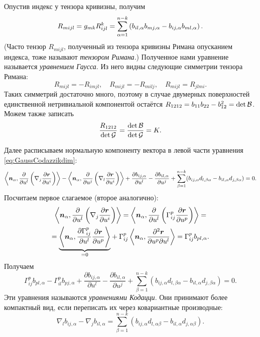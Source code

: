 Опустив индекс у тензора кривизны, получим
\[
	R_{mijl} = g_{mk}R^k_{ijl} = \sum_{\alpha = 1}^{n - k}\left(b_{il, \alpha}b_{mj, \alpha} - b_{ij, \alpha}b_{ml, \alpha}\right).
\]
(Часто тензор $R_{mijl}$, полученный из тензора кривизны Римана опусканием индекса, тоже называют \textit{тензором Римана}.) Полученное нами уравнение называется \textit{уравнением Гаусса}. Из него видны следующие симметрии тензора Римана:
\[
	R_{mijl} = -R_{imjl},\quad R_{mijl} = -R_{milj},\quad R_{mijl} = R_{jlmi}.
\]
Таких симметрий достаточно много, поэтому в случае двумерных поверхностей единственной нетривиальной компонентой остаётся $R_{1212} = b_{11}b_{22} - b_{12}^2 = \det\mathcal{B}$. Можем также записать
\[
	\frac{R_{1212}}{\det\mathcal{G}} = \frac{\det\mathcal{B}}{\det\mathcal{G}} = K.
\]

Далее расписываем нормальную компоненту вектора в левой части уравнения \eqref{eq:GaussCodazzikdim}:
\[
	\left\langle\boldsymbol{n}_\alpha, \frac{\partial}{\partial u^l}\left(\nabla_j\frac{\partial\boldsymbol{r}}{\partial u^i}\right)\right\rangle - \left\langle\boldsymbol{n}_\alpha, \frac{\partial}{\partial u^j}\left(\nabla_l\frac{\partial\boldsymbol{r}}{\partial u^i}\right)\right\rangle + \frac{\partial b_{ij, \alpha}}{\partial u^l} - \frac{\partial b_{il, \alpha}}{\partial u^j} + \sum_{\beta = 1}^{n - k}(b_{ij, \alpha}d_{l, \beta\alpha} - b_{il, \alpha}d_{j, \beta\alpha}) = 0.
\]
Посчитаем первое слагаемое (второе аналогично):
\begin{multline*}
	\left\langle\boldsymbol{n}_\alpha, \frac{\partial}{\partial u^l}\left(\nabla_j\frac{\partial\boldsymbol{r}}{\partial u^i}\right)\right\rangle = \left\langle\boldsymbol{n}_\alpha, \frac{\partial}{\partial u^l}\left(\Gamma_{ij}^p\frac{\partial\boldsymbol{r}}{\partial u^p}\right)\right\rangle =\\ = {\underbrace{\left\langle\boldsymbol{n}_\alpha, \frac{\partial\Gamma_{ij}^p}{\partial u^l}\frac{\partial\boldsymbol{r}}{\partial u^p}\right\rangle}_{= 0}} + \Gamma_{ij}^p\left\langle\boldsymbol{n}_\alpha, \frac{\partial^2\boldsymbol{r}}{\partial u^p\partial u^l}\right\rangle = \Gamma_{ij}^pb_{pl, \alpha}.
\end{multline*}
Получаем
\[
	\Gamma_{ij}^pb_{pl, \alpha} - \Gamma_{il}^pb_{pj, \alpha} + \frac{\partial b_{ij, \alpha}}{\partial u^l} - \frac{\partial b_{il, \alpha}}{\partial u^j} + \sum_{\beta = 1}^{n - k}(b_{ij, \alpha}d_{l, \beta\alpha} - b_{il, \alpha}d_{j, \beta\alpha}) = 0.
\]
Эти уравнения называются \textit{уравнениями Кодацци}. Они принимают более компактный вид, если переписать их через ковариантные производные:
\[
	\nabla_lb_{ij, \alpha} - \nabla_jb_{il, \alpha} = \sum_{\beta = 1}^{n - k}(b_{ij, \alpha}d_{l, \alpha\beta} - b_{il, \alpha}d_{j, \alpha\beta}).
\]

